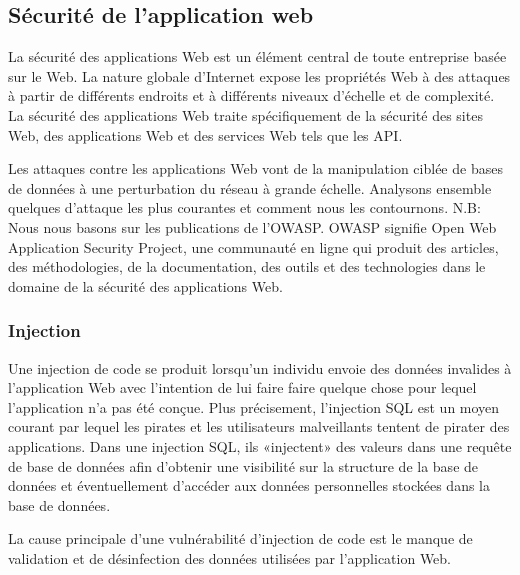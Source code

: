 \subsection{Sécurité de l'application web}
    La sécurité des applications Web est un élément central de 
    toute entreprise basée sur le Web. La nature globale d'Internet 
    expose les propriétés Web à des attaques à partir de différents 
    endroits et à différents niveaux d'échelle et de complexité. 
    La sécurité des applications Web traite spécifiquement de la 
    sécurité des sites Web, des applications Web et des services 
    Web tels que les API.
    \par 
    Les attaques contre les applications Web vont de la manipulation 
    ciblée de bases de données à une perturbation du réseau à grande 
    échelle. Analysons ensemble quelques d’attaque les plus courantes
    et comment nous les contournons. N.B: Nous nous basons sur les publications
    de l'OWASP.
    OWASP signifie Open Web Application Security Project, une communauté 
    en ligne qui produit des articles, des méthodologies, de la documentation, 
    des outils et des technologies dans le domaine de la sécurité des applications 
    Web.
    
    
    \subsubsection{Injection}
    Une injection de code se produit lorsqu'un individu envoie des données 
    invalides à l'application Web avec l'intention de lui faire faire quelque 
    chose pour lequel l'application n'a pas été conçue. Plus précisement,
    l'injection SQL est un moyen courant par lequel les pirates et les 
    utilisateurs malveillants tentent de pirater des applications. Dans une 
    injection SQL, ils «injectent» des valeurs dans une requête de base de 
    données afin d’obtenir une visibilité sur la structure de la base de 
    données et éventuellement d’accéder aux données personnelles stockées 
    dans la base de données.
    \par 
    La cause principale d'une vulnérabilité d'injection de code est le manque 
    de validation et de désinfection des données utilisées par l'application Web.